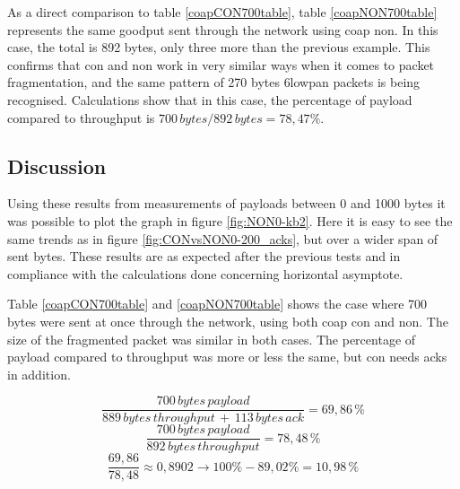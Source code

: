 \noindent As a direct comparison to table \ref{coapCON700table}, table \ref{coapNON700table} represents the same \gls{goodput} sent through the network using \gls{coap} \gls{non}. In this case, the total is 892 bytes, only three more than the previous example. This confirms that \gls{con} and \gls{non} work in very similar ways when it comes to packet fragmentation, and the same pattern of 270 bytes \gls{6lowpan} packets is being recognised. Calculations show that in this case, the percentage of \gls{payload} compared to throughput is $700 \, bytes/892 \, bytes = 78,47 \%$. 



\subsection{Discussion}

\noindent Using these results from measurements of \glspl{payload} between 0 and 1000 bytes it was possible to plot the graph in figure \ref{fig:NON0-kb2}. Here it is easy to see the same trends as in figure \ref{fig:CONvsNON0-200_acks}, but over a wider span of sent bytes. These results are as expected after the previous tests and in compliance with the calculations done concerning horizontal asymptote.  


\noindent Table \ref{coapCON700table} and \ref{coapNON700table} shows the case where 700 bytes were sent at once through the network, using both \gls{coap} \gls{con} and \gls{non}. The size of the fragmented packet was similar in both cases. The percentage of \gls{payload} compared to \gls{throughput} was more or less the same, but \gls{con} needs \glspl{ack} in addition. 

\begin{equation} \label{lessThanHAlfAPercentCalculation} 
	\frac{700 \, bytes \, payload}{889 \, bytes \, throughput \, + \, 113 \, bytes \, ack} = 69,86 \,\%
\end{equation}
\begin{equation} \label{lessThanHAlfAPercentCalculation2} 
	\frac{700 \, bytes \, payload}{892 \, bytes \, throughput} = 78,48 \,\%
\end{equation}	
\begin{equation} \label{lessThanHAlfAPercentCalculation3}	
    \frac{69,86}{78,48} \approx 0,8902  \rightarrow 100 \% - 89,02 \% = 10,98 \,\%
\end{equation}

